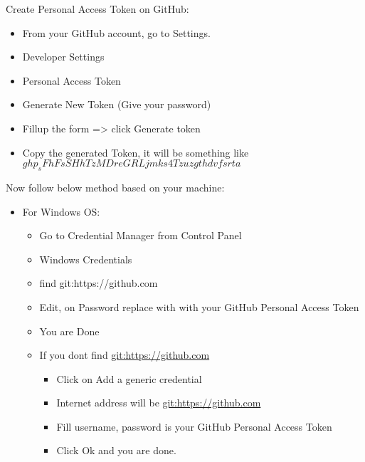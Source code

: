 Create Personal Access Token on GitHub:
    \begin{itemize}
        \item From your GitHub account, go to Settings.
        \item Developer Settings 
        \item Personal Access Token
        \item Generate New Token (Give your password)
        \item Fillup the form => click Generate token
        \item Copy the generated Token, it will be something like $ghp_sFhFsSHhTzMDreGRLjmks4Tzuzgthdvfsrta$
    \end{itemize}
    Now follow below method based on your machine:
    \begin{itemize}
        \item For Windows OS:
        \begin{itemize}
            \item Go to Credential Manager from Control Panel
            \item Windows Credentials
            \item find git:https://github.com
            \item Edit, on Password replace with with your GitHub Personal Access Token
            \item You are Done
            \item If you dont find \url{git:https://github.com} 
            \begin{itemize}
                \item Click on Add a generic credential
                \item Internet address will be \url{git:https://github.com}
                \item Fill username, password is your GitHub Personal Access Token 
                \item Click Ok and you are done.
            \end{itemize} 
        \end{itemize}    
    \end{itemize}


